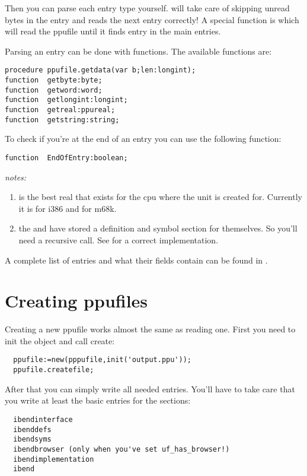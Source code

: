 {Then you can parse each entry type yourself.  will take
care of skipping unread bytes in the entry and reads the next entry
correctly! A special function is 
which will read the ppufile until it finds entry  in the main
entries.

Parsing an entry can be done with  functions. The
available functions are:
\begin{verbatim}
procedure ppufile.getdata(var b;len:longint);
function  getbyte:byte;
function  getword:word;
function  getlongint:longint;
function  getreal:ppureal;
function  getstring:string;
\end{verbatim}

To check if you're at the end of an entry you can use the following
function:

\begin{verbatim}
function  EndOfEntry:boolean;
\end{verbatim}
{\em notes:}
\begin{enumerate}
\item {} is the best real that exists for the cpu where the
unit is created for. Currently it is  for i386 and
 for m68k.
\item the  and  have stored a definition
and symbol section for themselves. So you'll need a recursive call. See
 for a correct implementation.
\end{enumerate}

A complete list of entries and what their fields contain can be found
in .

\section{Creating ppufiles}
Creating a new ppufile works almost the same as reading one.
First you need to init the object and call create:
\begin{verbatim}
  ppufile:=new(pppufile,init('output.ppu'));
  ppufile.createfile;
\end{verbatim}

After that you can simply write all needed entries. You'll have to take
care that you write at least the basic entries for the sections:
\begin{verbatim}
  ibendinterface
  ibenddefs
  ibendsyms
  ibendbrowser (only when you've set uf_has_browser!)
  ibendimplementation
  ibend
\end{verbatim}

}
